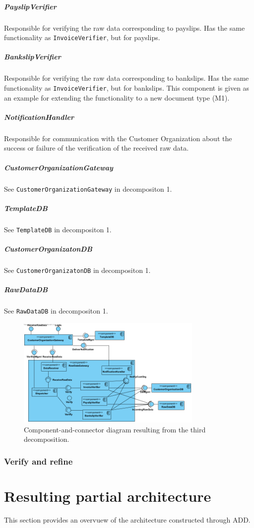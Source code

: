\documentclass[a4paper,10pt]{article}
\begin{document}
\subparagraph{PayslipVerifier} Responsible for verifying the raw data corresponding to payslips. Has the same functionality as \texttt{InvoiceVerifier}, but for payslips.

\subparagraph{BankslipVerifier} Responsible for verifying the raw data corresponding to bankslips. Has the same functionality as \texttt{InvoiceVerifier}, but for bankslips. This component is given as an example for extending the functionality to a new document type (M1).

\subparagraph{NotificationHandler} Responsible for communication with the Customer Organization about the success or failure of the verification of the received raw data.

\subparagraph{CustomerOrganizationGateway} See \texttt{CustomerOrganizationGateway} in decompositon 1.

\subparagraph{TemplateDB} See \texttt{TemplateDB} in decompositon 1.
\subparagraph{CustomerOrganizatonDB} See \texttt{CustomerOrganizatonDB} in decompositon 1.
\subparagraph{RawDataDB} See \texttt{RawDataDB} in decompositon 1.

\begin{figure}[!htp]
	\centering
	\includegraphics[width=0.8\textwidth]{RawDataGateway.png}
	\caption{Component-and-connector diagram resulting from the third decomposition.
	}\label{fig:compandcondecomp3}
\end{figure}

\subsubsection{Verify and refine}

\section{Resulting partial architecture}\label{sec:architecture}
This section provides an overvuew of the architecture constructed through ADD\@.
\end{document}
